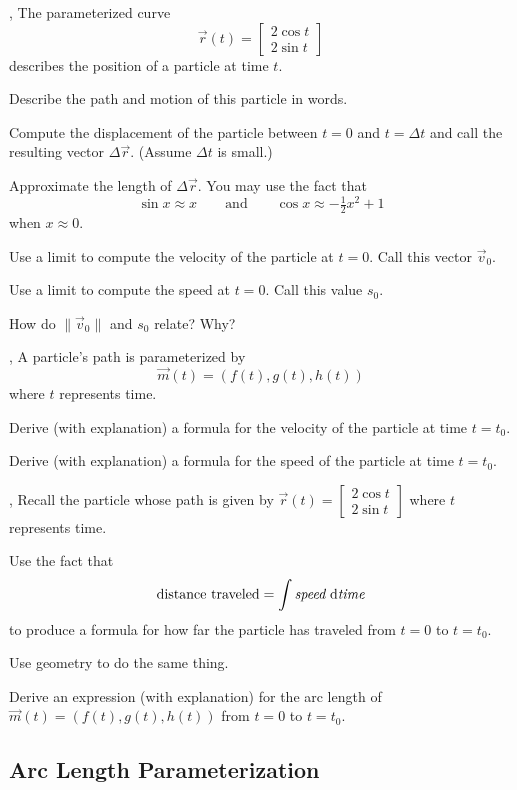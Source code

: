 \documentclass[letter]{article}
\newcommand{\mat}[1]{\begin{bmatrix}#1\end{bmatrix}}
\begin{document}
	\sep
	The parameterized curve
	\[
		\vec r(t) = \mat{2\cos t\\2\sin t}
	\]
	describes the position of a particle at time $t$.
	\begin{Enum}
		\item Describe the path and motion of this particle in words.
		\item Compute the displacement  of the particle between $t=0$
			and $t=\Delta t$ and call the resulting vector $\Delta \vec r$.  
			(Assume $\Delta t$ is small.)
		\item Approximate the length of $\Delta \vec r$.  You may use the fact that
			\[
				\sin x\approx x\qquad\text{and}\qquad \cos x\approx -\tfrac{1}{2}x^2+1
			\]
			when $x\approx 0$.
		\item Use a limit to compute the velocity of the particle at $t=0$. Call this 
			vector $\vec v_0$.
		\item Use a limit to compute the speed at $t=0$.  Call this value $s_0$.
		\item How do $\|\vec v_0\|$ and $s_0$ relate?  Why?
	\end{Enum}

	\sep
	A particle's path is parameterized by
	\[
		\vec m(t) = (f(t), g(t), h(t))
	\]
	where $t$ represents time.
	\begin{Enum}
		\item Derive (with explanation) a formula for the velocity of
			the particle at time $t=t_0$.
		\item Derive (with explanation) a formula for the speed of
			the particle at time $t=t_0$.
	\end{Enum}
	
	\sep
	Recall the particle whose path is given by
	$
		\vec r(t) = \mat{2\cos t\\2\sin t}
	$
	where $t$ represents time.
	\begin{Enum}
		\item Use the fact that
			\[
				\text{distance traveled}=\int\text{\it speed}\ \mathrm{d}\text{\it time}
			\]
		to produce a formula for how far the particle has traveled from $t=0$ to $t=t_0$.
		\item Use geometry to do the same thing.
		\item Derive an expression (with explanation) for the arc length of $\vec m(t) = (f(t), g(t), h(t))$
			from $t=0$ to $t=t_0$.
	\end{Enum}

\subsection*{Arc Length Parameterization}
	
\end{document}
